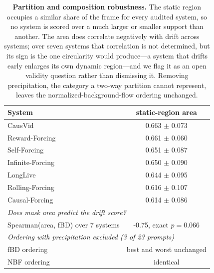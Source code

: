 \begin{table}[tb]
\centering
\small
\begin{tabular}{l c}
\toprule
System & static-region area \\
\midrule
CausVid & 0.663 $\pm$ 0.073 \\
Reward-Forcing & 0.661 $\pm$ 0.060 \\
Self-Forcing & 0.651 $\pm$ 0.087 \\
Infinite-Forcing & 0.650 $\pm$ 0.090 \\
LongLive & 0.644 $\pm$ 0.095 \\
Rolling-Forcing & 0.616 $\pm$ 0.107 \\
Causal-Forcing & 0.614 $\pm$ 0.086 \\
\midrule
\multicolumn{2}{l}{\emph{Does mask area predict the drift score?}} \\
Spearman(area, fBD) over 7 systems & -0.75, exact $p=0.066$ \\
\midrule
\multicolumn{2}{l}{\emph{Ordering with precipitation excluded (3 of 23 prompts)}} \\
fBD ordering & best and worst unchanged \\
NBF ordering & identical \\
\bottomrule
\end{tabular}
\caption{\textbf{Partition and composition robustness.} The static region occupies a similar share of the frame for every audited system, so no system is scored over a much larger or smaller support than another. The area does correlate negatively with drift across systems; over seven systems that correlation is not determined, but its sign is the one circularity would produce---a system that drifts early enlarges its own dynamic region---and we flag it as an open validity question rather than dismissing it. Removing precipitation, the category a two-way partition cannot represent, leaves the normalized-background-flow ordering unchanged.}
\label{tab:robustness}
\end{table}